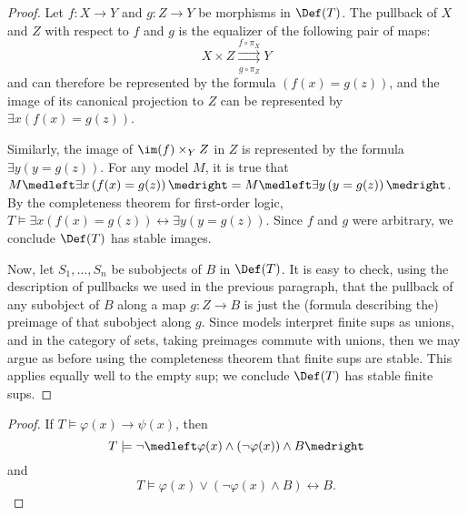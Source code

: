 \documentclass[11pt]{article}
\begin{document}
\begin{proof}
  Let $f : X \to Y$ and $g : Z \to Y$ be morphisms in $\Def(T)$. The pullback of $X$ and $Z$ with respect to $f$ and $g$ is the equalizer of the following pair of maps:
  $$
X \times Z \overset{f \circ \pi_X}{\underset{g \circ \pi_Z}{\rightrightarrows}} Y
$$
and can therefore be represented by the formula $\left(f(x) = g(z)\right)$, and the image of its canonical projection to $Z$ can be represented by $\exists x \left(f(x) = g(z)\right)$.

Similarly, the image of $\im(f) \times_Y Z$ in $Z$ is represented by the formula $\exists y \left(y = g(z) \right)$. For any model $M$, it is true that $M \medleft \exists x \left(f(x) = g(z) \right) \medright = M \medleft \exists y \left(y = g(z) \right) \medright$. By the completeness theorem for first-order logic, $T \models \exists x \left(f(x) = g(z) \right) \leftrightarrow \exists y \left(y = g(z) \right)$. Since $f$ and $g$ were arbitrary, we conclude $\Def(T)$ has stable images.

Now, let $S_1, \dots, S_n$ be subobjects of $B$ in $\Def(T)$. It is easy to check, using the description of pullbacks we used in the previous paragraph, that the pullback of any subobject of $B$ along a map $g : Z \to B$ is just the (formula describing the) preimage of that subobject along $g$. Since models interpret finite sups as unions, and in the category of sets, taking preimages commute with unions, then we may argue as before using the completeness theorem that finite sups are stable. This applies equally well to the empty sup; we conclude $\Def(T)$ has stable finite sups.
\end{proof}



\begin{proof}
If $T \models \varphi(x) \rightarrow \psi(x)$, then $$T \models \neg \medleft\varphi(x) \land (\neg \varphi(x)) \land B\medright$$ and $$T \models \varphi(x) \lor \left(\neg \varphi(x) \land B\right) \leftrightarrow B.$$
  \end{proof}
\end{document}
